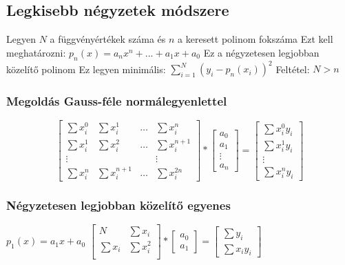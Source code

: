 \documentclass[12pt,a4paper]{article}
\begin{document}
\subsection{Legkisebb négyzetek módszere}

\begin{outline}
	\1 Legyen $N$ a függvényértékek száma és $n$ a keresett polinom fokszáma
	\1 Ezt kell meghatározni: $p_n(x) = a_nx^n + ... + a_1x + a_0$
		\2 Ez a négyzetesen legjobban közelítő polinom
	\1 Ez legyen minimális: $\sum_{i=1}^{N} (y_i - p_n(x_i))^2$
	\1 Feltétel: $N>n$
\end{outline}

\subsubsection{Megoldás Gauss-féle normálegyenlettel}

$$
\begin{bmatrix}
	\sum x_i^0 & \sum x_i^1 & \dots & \sum x_i^n \\
	\sum x_i^1 & \sum x_i^2 & \dots & \sum x_i^{n+1} \\
	\vdots & & & \vdots \\
	\sum x_i^n & \sum x_i^{n+1} & \dots & \sum x_i^{2n}
\end{bmatrix}
*
\begin{bmatrix} a_0 \\ a_1 \\ \vdots \\ a_n \end{bmatrix}
=
\begin{bmatrix} \sum x_i^0 y_i \\ \sum x_i^1 y_i \\ \vdots \\ \sum x_i^n y_i \end{bmatrix}
$$

\subsubsection{Négyzetesen legjobban közelítő egyenes}

\begin{outline}
	\1 $p_1(x) = a_1x + a_0$
	\1 $\begin{bmatrix} N & \sum x_i \\ \sum x_i & \sum x_i^2 \\ \end{bmatrix}
	* \begin{bmatrix} a_0 \\ a_1 \end{bmatrix}
	= \begin{bmatrix} \sum y_i \\ \sum x_i y_i \end{bmatrix} $
\end{outline}
\end{document}
